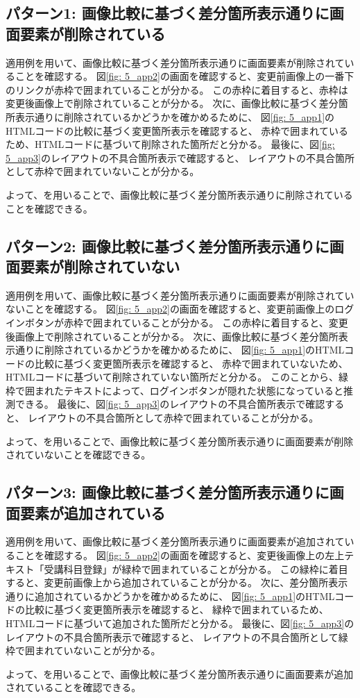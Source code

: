 \subsection{パターン1: 画像比較に基づく差分箇所表示通りに画面要素が削除されている}\label{sec:result_area_detection}
適用例を用いて、画像比較に基づく差分箇所表示通りに画面要素が削除されていることを確認する。
図\ref{fig: 5_app2}の画面を確認すると、変更前画像上の一番下のリンクが赤枠で囲まれていることが分かる。
この赤枠に着目すると、赤枠は変更後画像上で削除されていることが分かる。
次に、画像比較に基づく差分箇所表示通りに削除されているかどうかを確かめるために、
図\ref{fig: 5_app1}のHTMLコードの比較に基づく変更箇所表示を確認すると、
赤枠で囲まれているため、HTMLコードに基づいて削除された箇所だと分かる。
最後に、図\ref{fig: 5_app3}のレイアウトの不具合箇所表示で確認すると、
レイアウトの不具合箇所として赤枠で囲まれていないことが分かる。
\par
よって、\toolName を用いることで、画像比較に基づく差分箇所表示通りに削除されていることを確認できる。



\subsection{パターン2: 画像比較に基づく差分箇所表示通りに画面要素が削除されていない}\label{sec:result_area2}
適用例を用いて、画像比較に基づく差分箇所表示通りに画面要素が削除されていないことを確認する。
図\ref{fig: 5_app2}の画面を確認すると、変更前画像上のログインボタンが赤枠で囲まれていることが分かる。
この赤枠に着目すると、変更後画像上で削除されていることが分かる。
次に、画像比較に基づく差分箇所表示通りに削除されているかどうかを確かめるために、
図\ref{fig: 5_app1}のHTMLコードの比較に基づく変更箇所表示を確認すると、
赤枠で囲まれていないため、HTMLコードに基づいて削除されていない箇所だと分かる。
このことから、緑枠で囲まれたテキストによって、ログインボタンが隠れた状態になっていると推測できる。
最後に、図\ref{fig: 5_app3}のレイアウトの不具合箇所表示で確認すると、
レイアウトの不具合箇所として赤枠で囲まれていることが分かる。
\par
よって、\toolName を用いることで、画像比較に基づく差分箇所表示通りに画面要素が削除されていないことを確認できる。


\subsection{パターン3: 画像比較に基づく差分箇所表示通りに画面要素が追加されている}\label{sec:result_area3}
適用例を用いて、画像比較に基づく差分箇所表示通りに画面要素が追加されていることを確認する。
図\ref{fig: 5_app2}の画面を確認すると、変更後画像上の左上テキスト「受講科目登録」が緑枠で囲まれていることが分かる。
この緑枠に着目すると、変更前画像上から追加されていることが分かる。
次に、差分箇所表示通りに追加されているかどうかを確かめるために、
図\ref{fig: 5_app1}のHTMLコードの比較に基づく変更箇所表示を確認すると、
緑枠で囲まれているため、HTMLコードに基づいて追加された箇所だと分かる。
最後に、図\ref{fig: 5_app3}のレイアウトの不具合箇所表示で確認すると、
レイアウトの不具合箇所として緑枠で囲まれていないことが分かる。
\par
よって、\toolName を用いることで、画像比較に基づく差分箇所表示通りに画面要素が追加されていることを確認できる。


